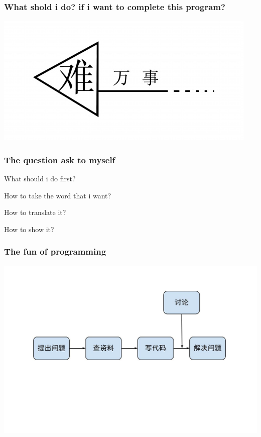 \documentclass[10pt]{beamer}
\begin{document}
\begin{CJK*}{UTF8}{song}
\begin{frame}
  \frametitle{What shold i do? if i want to complete this program?}
\begin{center} 
  \includegraphics[width=1.\textwidth]{myfirststep.jpg}

\end{center}

\end{frame}
\begin{frame}
  \frametitle{\Large{The question ask to myself}}
\begin{itemize}
 \LARGE{ \item What should i do first?
  \item How to take the word that i want?
  \item How to translate it?
  \item How to show it?}
\end{itemize}
\end{frame}

\begin{frame}
  \frametitle{\Large{The fun of programming}}
  
\begin{center} 
  \includegraphics[width=1.2\textwidth]{process.jpg}
  

\end{center}
\end{frame}
\end{CJK*}
\end{document}

